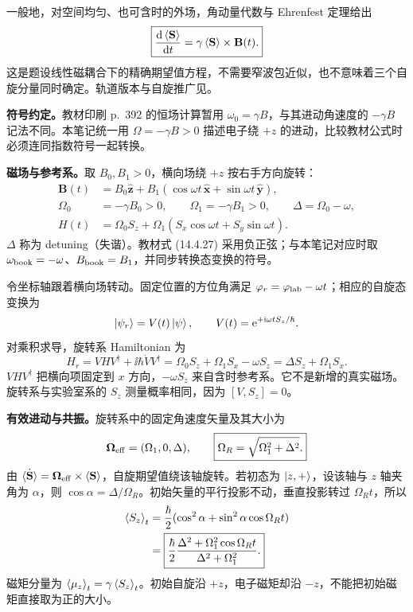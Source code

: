 一般地，对空间均匀、也可含时的外场，角动量代数与 Ehrenfest 定理给出
\begin{equation}
  \boxed{\frac{\mathop{}\!\mathrm{d}\left\langle \mathbf S \right\rangle}{\mathop{}\!\mathrm{d} t}
       =\gamma\left\langle \mathbf S \right\rangle\times\mathbf B(t).}
\end{equation}
这是题设线性磁耦合下的精确期望值方程，不需要窄波包近似，也不意味着三个自旋分量同时确定。轨道版本与自旋推广见。

\textbf{符号约定。}教材印刷 p.~392 的恒场计算暂用 $\omega_0=\gamma B$，与其进动角速度的 $-\gamma B$ 记法不同。本笔记统一用 $\Omega=-\gamma B>0$ 描述电子绕 $+z$ 的进动，比较教材公式时必须连同指数符号一起转换。

\textbf{磁场与参考系。}取 $B_0,B_1>0$，横向场绕 $+z$ 按右手方向旋转：
\begin{align}
  \mathbf B(t)&=B_0\hat{\mathbf z}
    +B_1(\cos\omega t\,\hat{\mathbf x}+\sin\omega t\,\hat{\mathbf y}),\\
  \Omega_0&=-\gamma B_0>0,\qquad \Omega_1=-\gamma B_1>0,\qquad
  \Delta=\Omega_0-\omega,\\
  H(t)&=\Omega_0S_z+\Omega_1(S_x\cos\omega t+S_y\sin\omega t).
\end{align}
$\Delta$ 称为 detuning（失谐）。教材式 (14.4.27) 采用负正弦；与本笔记对应时取 $\omega_{\rm book}=-\omega$、$B_{\rm book}=B_1$，并同步转换态变换的符号。

令坐标轴跟着横向场转动。固定位置的方位角满足 $\varphi_r=\varphi_{\rm lab}-\omega t$；相应的自旋态变换为
\begin{equation}
  \left|\psi_r\right\rangle=V(t)\left|\psi\right\rangle,\qquad V(t)=\mathrm{e}^{+\mathrm{i}\omega tS_z/\hbar}.
\end{equation}
对乘积求导，旋转系 Hamiltonian 为
\begin{equation}
  H_r=VHV^\dagger+\ii\hbar\dot VV^\dagger
     =\Omega_0S_z+\Omega_1S_x-\omega S_z
     =\boxed{\Delta S_z+\Omega_1S_x.}
\end{equation}
$VHV^\dagger$ 把横向项固定到 $x$ 方向，$-\omega S_z$ 来自含时参考系。它不是新增的真实磁场。旋转系与实验室系的 $S_z$ 测量概率相同，因为 $[V,S_z]=0$。

\textbf{有效进动与共振。}旋转系中的固定角速度矢量及其大小为
\begin{equation}
  \boldsymbol\Omega_{\rm eff}=(\Omega_1,0,\Delta),\qquad
  \boxed{\Omega_R=\sqrt{\Omega_1^2+\Delta^2}.}
\end{equation}
由 $\dot{\left\langle \mathbf S \right\rangle}=\boldsymbol\Omega_{\rm eff}\times\left\langle \mathbf S \right\rangle$，自旋期望值绕该轴旋转。若初态为 $\left|z,+\right\rangle$，设该轴与 $z$ 轴夹角为 $\alpha$，则 $\cos\alpha=\Delta/\Omega_R$。初始矢量的平行投影不动，垂直投影转过 $\Omega_Rt$，所以
\begin{align}
  \left\langle S_z \right\rangle_t
    &=\frac\hbar2(\cos^2\alpha+\sin^2\alpha\cos\Omega_Rt)\notag\\
    &=\boxed{\frac\hbar2
       \frac{\Delta^2+\Omega_1^2\cos\Omega_Rt}{\Delta^2+\Omega_1^2}.}
\end{align}
磁矩分量为 $\left\langle \mu_z \right\rangle_t=\gamma\left\langle S_z \right\rangle_t$。初始自旋沿 $+z$，电子磁矩却沿 $-z$，不能把初始磁矩直接取为正的大小。

